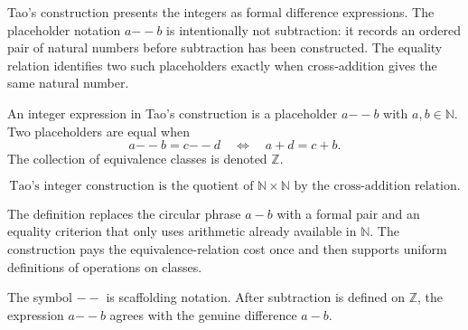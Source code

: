 
\begin{remark*}[Exposition]
Tao's construction presents the integers as formal difference expressions.
The placeholder notation \(a {-\!\!-} b\) is intentionally not subtraction:
it records an ordered pair of natural numbers before subtraction has been
constructed. The equality relation identifies two such placeholders exactly
when cross-addition gives the same natural number.
\end{remark*}

\begin{definition}
\label{def:tao-integer-expression}
An integer expression in Tao's construction is a placeholder \(a {-\!\!-} b\)
with \(a,b\in\mathbb{N}\). Two placeholders are equal when
\[
  a {-\!\!-} b = c {-\!\!-} d
  \quad\Longleftrightarrow\quad
  a+d=c+b.
\]
The collection of equivalence classes is denoted \(\mathbb{Z}\).
\end{definition}




\begin{remark*}
\[
  \text{Tao's integer construction is the quotient of }
  \mathbb{N}\times\mathbb{N}
  \text{ by the cross-addition relation.}
\]
\end{remark*}

\begin{remark*}[Interpretation]
The definition replaces the circular phrase \(a-b\) with a formal pair and an
equality criterion that only uses arithmetic already available in
\(\mathbb{N}\). The construction pays the equivalence-relation cost once and
then supports uniform definitions of operations on classes.
\end{remark*}

\begin{remark*}[Notation]
The symbol \(--\) is scaffolding notation. After subtraction is defined on
\(\mathbb{Z}\), the expression \(a {-\!\!-} b\) agrees with the genuine
difference \(a-b\).
\end{remark*}

